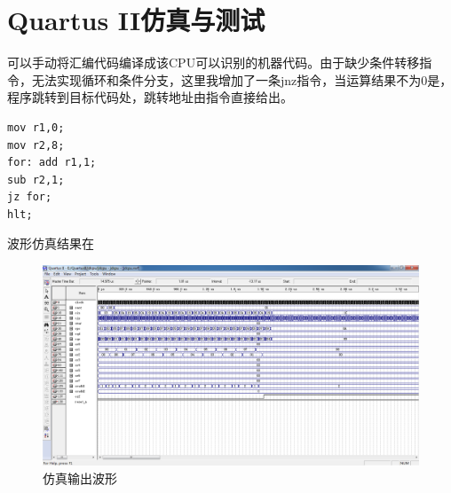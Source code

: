 \section{Quartus II仿真与测试}
可以手动将汇编代码编译成该CPU可以识别的机器代码。由于缺少条件转移指令，无法实现循环和条件分支，这里我增加了一条jnz指令，当运算结果不为0是，程序跳转到目标代码处，跳转地址由指令直接给出。
\begin{lstlisting}[language={[x86masm]Assembler}]
mov r1,0;
mov r2,8;
for: add r1,1;
sub r2,1;
jz for;
hlt;
\end{lstlisting}
波形仿真结果在
\begin{figure}[H]
\centering
\includegraphics[scale=0.45]{vector.png}
\caption{仿真输出波形}
\end{figure}